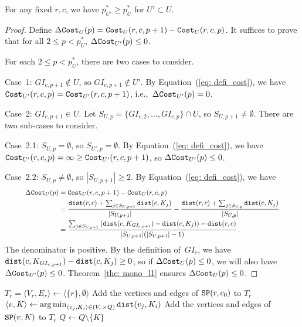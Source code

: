\begin{theorem}
\label{the: rightmost-argmin}
  For any fixed $r,c$, we have $p^*_{U'} \geq p^*_U$ for $U' \subset U$.
\end{theorem}
\begin{proof}
    Define $\Delta\mathtt{Cost}_U(p) = \mathtt{Cost}_U(r,c,p+1)-\mathtt{Cost}_U(r,c,p)$. It suffices to prove that for all $2 \leq p < p^*_U$, $\Delta\mathtt{Cost}_{U'}(p) \leq 0$.

    For each $2 \leq p < p^*_U$, there are two cases to consider.

    Case~1: $GI_{c,p+1} \notin U$, so $GI_{c,p+1} \notin U'$. By Equation~(\ref{eq: defi_cost}), we have $\mathtt{Cost}_{U'}(r,c,p)=\mathtt{Cost}_{U'}(r,c,p+1)$, i.e.,~$\Delta\mathtt{Cost}_{U'}(p)=0$.
    
    Case~2: $GI_{c,p+1} \in U$. Let $S_{U,p} = \{GI_{c,2},\dots,GI_{c,p}\} \cap U$, so $S_{U,p+1} \neq \emptyset$. There are two sub-cases to consider.

    Case~2.1: $S_{U,p} = \emptyset$, so $S_{U',p} = \emptyset$. By Equation~(\ref{eq: defi_cost}), we have $\mathtt{Cost}_{U'}(r,c,p) = \infty \geq \mathtt{Cost}_{U'}(r,c,p+1)$, so $\Delta\mathtt{Cost}_{U'}(p) \leq 0$.

    Case~2.2: $S_{U,p} \neq \emptyset$, so $|S_{U,p+1}| \geq 2$. By Equation~(\ref{eq: defi_cost}), we have
    \begin{equation}
    \resizebox{0.9\linewidth}{!}{$
    \displaystyle
    \begin{aligned}
        \Delta\Cost_U(p) & = \Cost_U(r,c,p+1)-\Cost_U(r,c,p) \\
        & = \frac{\dist(r,c)+\sum_{j \in S_{U,p+1}}{\dist(c,K_j)}}{|S_{U,p+1}|} - \frac{\dist(r,c)+\sum_{j \in S_{U,p}}{\dist(c,K_j)}}{|S_{U,p}|} \\
        & = \frac{\sum_{j \in S_{U,p+1}}{(\dist(c,K_{GI_{c,p+1}})-\dist(c,K_j))} - \dist(r,c)}{|S_{U,p+1}| (|S_{U,p+1}| - 1)} \,.
    \end{aligned}
    $}
    \end{equation}
    \noindent The denominator is positive. By the definition of~$GI_c$, we have $\mathtt{dist}(c,K_{GI_{c,p+1}})-\mathtt{dist}(c,K_j) \geq 0$, so if $\Delta\mathtt{Cost}_U(p) \leq 0$, we will also have $\Delta\mathtt{Cost}_{U'}(p) \leq 0$. Theorem~\ref{the: mono_l1} ensures $\Delta\mathtt{Cost}_U(p) \leq 0$.
\end{proof}

\begin{algorithm}[t]
    $T_r = \langle V_r,E_r \rangle \leftarrow \langle \{r\},\emptyset\rangle$\;
    {
        Add the vertices and edges of \(\mathtt{SP}(r,c_0)\) to \(T_r\)\;
    }   
    {
        \(\langle v,K \rangle \leftarrow \operatorname*{arg\,min}_{\langle v_j,K_i \rangle \in (V_r \times Q)} \mathtt{dist}(v_j,K_i)\)\;
        Add the vertices and edges of \(\mathtt{SP}(v,K)\) to \(T_r\)\;
        \(Q\leftarrow Q\setminus \{K\}\)\;
    }
    \;
\caption{\ConstructTree} 
\label{alg: ConstructTree}
\end{algorithm}

